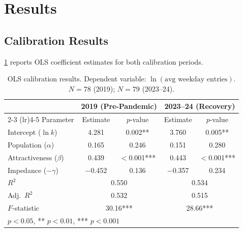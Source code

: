 \documentclass[11pt]{article}
\begin{document}
\section{Results}
\label{sec:results}

\subsection{Calibration Results}

\cref{tab:calibration} reports OLS coefficient estimates for both
calibration periods.

\begin{table}[H]
    \centering
    \caption{OLS calibration results. Dependent variable:
             $\ln(\text{avg weekday entries})$.
             $N = 78$ (2019); $N = 79$ (2023--24).}
    \label{tab:calibration}
    \begin{tabular}{lcccc}
        \toprule
        & \multicolumn{2}{c}{2019 (Pre-Pandemic)} &
          \multicolumn{2}{c}{2023--24 (Recovery)} \\
        \cmidrule(lr){2-3} \cmidrule(lr){4-5}
        Parameter & Estimate & $p$-value & Estimate & $p$-value \\
        \midrule
        Intercept ($\ln k$)          & 4.281 & 0.002** & 3.760 & 0.005** \\
        Population ($\alpha$)        & 0.165 & 0.246   & 0.151 & 0.280   \\
        Attractiveness ($\beta$)     & 0.439 & $<$0.001*** & 0.443 & $<$0.001*** \\
        Impedance ($-\gamma$)        & $-$0.452 & 0.136 & $-$0.357 & 0.234 \\
        \midrule
        $R^2$                        & \multicolumn{2}{c}{0.550} &
                                       \multicolumn{2}{c}{0.534} \\
        Adj.\ $R^2$                  & \multicolumn{2}{c}{0.532} &
                                       \multicolumn{2}{c}{0.515} \\
        $F$-statistic                & \multicolumn{2}{c}{30.16***} &
                                       \multicolumn{2}{c}{28.66***} \\
        \bottomrule
        \multicolumn{5}{l}{\small * $p < 0.05$, ** $p < 0.01$, *** $p < 0.001$}
    \end{tabular}
\end{table}
\end{document}
